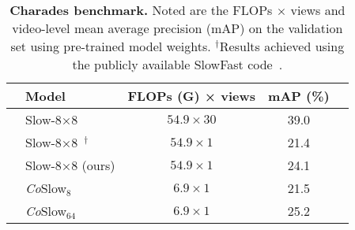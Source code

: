\begin{table}[t]
	\begin{center}
	\begin{tabular}{llccc}
		\toprule
        & \textbf{Model}                & \textbf{FLOPs (G) × views}        & \textbf{mAP (\%)}  \\
		\midrule
        \parbox[t]{1mm}{}
		& Slow-8×8~\cite{feichtenhofer2019slowfast}  
		                                & $54.9 \times 30$          & 39.0      \\
        & Slow-8×8~\cite{feichtenhofer2019slowfast}$^\dagger$     
                                        & $54.9 \times 1$           & 21.4      \\
        & Slow-8×8 (ours)    & $54.9 \times 1$           & 24.1      \\

		\midrule
		\parbox[t]{1mm}{}
        & \textit{Co}Slow$_8$             & $6.9 \times 1$          & 21.5      \\
        & \textit{Co}Slow$_{64}$          & $6.9 \times 1$          & 25.2      \\
        
		\bottomrule
	\end{tabular}
	\end{center}
	\caption{
	    \textbf{Charades benchmark.} Noted are the FLOPs $\times$ views and video-level mean average precision (mAP) on the validation set using pre-trained model weights. 
        $^\dagger$Results achieved using the publicly available SlowFast code~\cite{feichtenhofer2019slowfast}.
	}
	\label{tab:charades}
	\vspace{-10mm}
\end{table}

